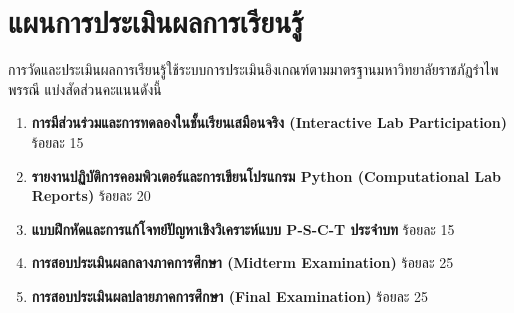 \vspace{8pt}
\section*{แผนการประเมินผลการเรียนรู้}
การวัดและประเมินผลการเรียนรู้ใช้ระบบการประเมินอิงเกณฑ์ตามมาตรฐานมหาวิทยาลัยราชภัฏรำไพพรรณี แบ่งสัดส่วนคะแนนดังนี้
\begin{enumerate}[leftmargin=1.5cm]
    \item \textbf{การมีส่วนร่วมและการทดลองในชั้นเรียนเสมือนจริง (Interactive Lab Participation)} ร้อยละ 15
    \item \textbf{รายงานปฏิบัติการคอมพิวเตอร์และการเขียนโปรแกรม Python (Computational Lab Reports)} ร้อยละ 20
    \item \textbf{แบบฝึกหัดและการแก้โจทย์ปัญหาเชิงวิเคราะห์แบบ P-S-C-T ประจำบท} ร้อยละ 15
    \item \textbf{การสอบประเมินผลกลางภาคการศึกษา (Midterm Examination)} ร้อยละ 25
    \item \textbf{การสอบประเมินผลปลายภาคการศึกษา (Final Examination)} ร้อยละ 25
\end{enumerate}
